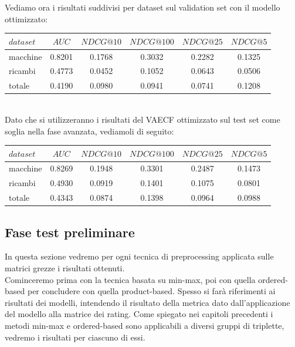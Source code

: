 Vediamo ora i risultati suddivisi per dataset sul validation set con il modello ottimizzato:\\

\begin{tabular}{|l|c|cccc|}
    \toprule
    $dataset$ &    $AUC$ &  $NDCG@10$ & $NDCG@100$  & $NDCG@25$ & $NDCG@5$  \\
    \midrule
    macchine & 0.8201 & 0.1768 & 0.3032 & 0.2282 & 0.1325 \\
    ricambi & 0.4773 & 0.0452 & 0.1052 & 0.0643 & 0.0506 \\
    totale  & 0.4190 & 0.0980 & 0.0941 & 0.0741 & 0.1208 \\
\bottomrule
\end{tabular}\\

Dato che si utilizzeranno i risultati del VAECF ottimizzato sul test set come soglia nella fase avanzata, vediamoli di seguito:\\

\begin{tabular}{|l|c|cccc|}
    \toprule
    $dataset$ &    $AUC$ &  $NDCG@10$ & $NDCG@100$  & $NDCG@25$ & $NDCG@5$  \\
    \midrule
    macchine & 0.8269 &  0.1948 &   0.3301 &  0.2487 & 0.1473 \\
    ricambi  & 0.4930 &  0.0919 &   0.1401 &  0.1075 & 0.0801 \\
    totale  & 0.4343 &  0.0874 &   0.1398 &  0.0964 & 0.0988 \\

\bottomrule
\end{tabular}

\subsection{Fase test preliminare}
In questa sezione vedremo per ogni tecnica di preprocessing applicata sulle matrici grezze i risultati ottenuti.\\
Cominceremo prima con la tecnica basata su min-max, poi con quella ordered-based per concludere con quella product-based. 
Spesso si farà riferimenti ai risultati dei modelli, intendendo il risultato della metrica dato dall'applicazione del modello alla matrice dei rating.
Come spiegato nei capitoli precedenti i metodi min-max e ordered-based sono applicabili a diversi gruppi di triplette, vedremo i risultati per ciascuno di essi.\\



